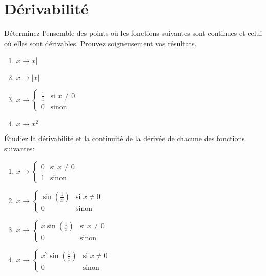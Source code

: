 \section{Dérivabilité}



\exerNico Déterminez l'ensemble des points où les fonctions suivantes
sont continues et celui où elles sont dérivables. Prouvez soigneusement
vos résultats.
\begin{enumerate}
	\item $ x \rightarrow x]$
	\item $ x \rightarrow |x| $
	\item $ x \rightarrow
		      \left\{ \begin{array}{ll}
			      \frac{1}{x} & \mbox{si } x \not= 0 \\
			      0           & \mbox{sinon}
		      \end{array} \right. $
	\item $ x \rightarrow x^2  $
\end{enumerate}




\exerNico Étudiez la dérivabilité et la continuité
de la dérivée de chacune des fonctions suivantes:
\begin{enumerate}
	\item $ x \rightarrow
		      \left\{ \begin{array}{ll}
			      0 & \mbox{si } x \not= 0 \\
			      1 & \mbox{sinon}
		      \end{array} \right.$
	\item $ x \rightarrow
		      \left\{ \begin{array}{ll}
			      \sin(\frac{1}{x}) & \mbox{si } x \not= 0 \\
			      0                 & \mbox{sinon}
		      \end{array} \right.$
	\item $ x \rightarrow
		      \left\{ \begin{array}{ll}
			      x \sin(\frac{1}{x}) & \mbox{si } x \not= 0 \\
			      0                   & \mbox{sinon}
		      \end{array} \right.$
	\item $ x \rightarrow
		      \left\{ \begin{array}{ll}
			      x^2 \sin(\frac{1}{x}) & \mbox{si } x \not= 0 \\
			      0                     & \mbox{sinon}
		      \end{array} \right.$
\end{enumerate}

